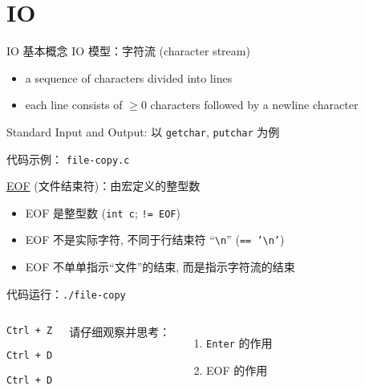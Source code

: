 \section{IO}

\begin{frame}{IO 基本概念}
  IO 模型：字符流 (character stream)
  \begin{itemize}
    \item a sequence of characters divided into lines
    \item each line consists of $\ge 0$ characters followed by a newline character 
  \end{itemize}
\end{frame}

\begin{frame}{Standard Input and Output: 以 \texttt{getchar}, \texttt{putchar} 为例}
  \centerline{代码示例： \texttt{file-copy.c}}

  \vspace{0.50cm}
  \pause
  \href{http://www.cplusplus.com/reference/cstdio/EOF/}{EOF} (文件结束符)：由宏定义的整型数
  \begin{itemize}
    \item EOF 是整型数 (\texttt{int c}; \texttt{!= EOF})
    \item EOF 不是实际字符, 不同于行结束符 ``\texttt{\textbackslash n}'' (\texttt{== '\textbackslash n'})
    \item EOF 不单单指示``文件''的结束, 而是指示字符流的结束
  \end{itemize}

  \pause
  \vspace{0.50cm}
  \centerline{代码运行：\texttt{./file-copy}}

  \pause
  \vspace{0.30cm}
  \begin{columns}[c]
      \begin{description}[Windows]
	\item[Windows] \texttt{Ctrl + Z}
	\item[Linux] \texttt{Ctrl + D}
	\item[Mac] \texttt{Ctrl + D}
      \end{description}
      请仔细观察并思考：
      \begin{enumerate}
	\item \texttt{Enter} 的作用
	\item EOF 的作用
      \end{enumerate}
  \end{columns}
\end{frame}

